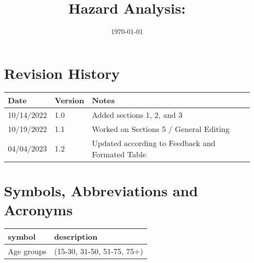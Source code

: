 \documentclass[12pt, titlepage]{article}
\begin{document}
\title{Hazard Analysis: \progname} 
\author{\authname}
\date{\today}
	
\maketitle


\section*{Revision History}

\begin{tabularx}{\textwidth}{p{3cm}p{2cm}X}
\toprule {\bf Date} & {\bf Version} & {\bf Notes}\\
\midrule
10/14/2022 & 1.0 & Added sections 1, 2, and 3\\
10/19/2022 & 1.1 & Worked on Sections 5 / General Editing\\
04/04/2023 & 1.2 & Updated according to Feedback and Formated Table\\
\bottomrule
\end{tabularx}

\newpage

\tableofcontents

\listoffigures

\listoftables

\newpage

\section*{Symbols, Abbreviations and Acronyms}

\renewcommand{\arraystretch}{1.2}
\begin{tabular}{l l} 
  \toprule		
  \textbf{symbol} & \textbf{description}\\
  \midrule 
  Age groups & (15-30, 31-50, 51-75, 75+)\\
  \bottomrule
\end{tabular}\\

\newpage

\end{document}
